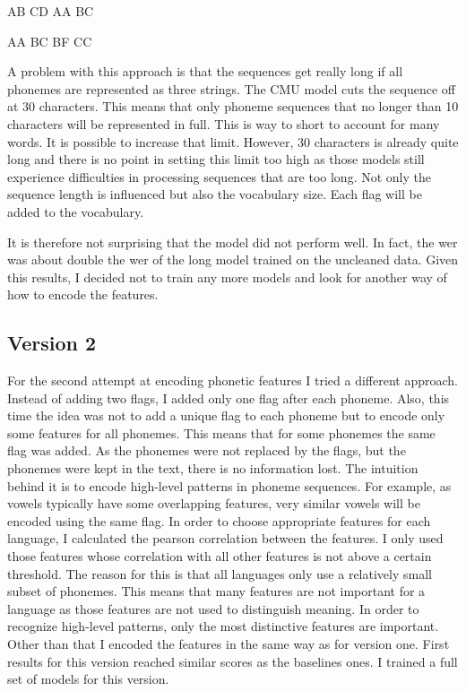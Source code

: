 \begin{covexamples}
\item \label{ex1}  AB CD  AA BC
\item \label{ex2}  AA BC   BF CC
\end{covexamples}

A problem with this approach is that the sequences get really long if all phonemes are represented as three strings. The CMU model cuts the sequence off at 30 characters. This means that only phoneme sequences that no longer than 10 characters will be represented in full. This is way to short to account for many words. It is possible to increase that limit. However, 30 characters is already quite long and there is no point in setting this limit too high as those models still experience difficulties in processing sequences that are too long. Not only the sequence length is influenced but also the vocabulary size. Each flag will be added to the vocabulary.  

It is therefore not surprising that the model did not perform well. In fact, the \ac{wer} was about double the \ac{wer} of the long model trained on the uncleaned data. Given this results, I decided not to train any more models and look for another way of how to encode the features.

\subsection*{Version 2}
For the second attempt at encoding phonetic features I tried a different approach. Instead of adding two flags, I added only one flag after each phoneme. Also, this time the idea was not to add a unique flag to each phoneme but to encode only some features for all phonemes. This means that for some phonemes the same flag was added. As the phonemes were not replaced by the flags, but the phonemes were kept in the text, there is no information lost. The intuition behind it is to encode high-level patterns in phoneme sequences. For example, as vowels typically have some overlapping features, very similar vowels will be encoded using the same flag. In order to choose appropriate features for each language, I calculated the pearson correlation between the features. I only used those features whose correlation with all other features is not above a certain threshold. The reason for this is that all languages only use a relatively small subset of phonemes. This means that many features are not important for a language as those features are not used to distinguish meaning. In order to recognize high-level patterns, only the most distinctive features are important. Other than that I encoded the features in the same way as for version one. First results for this version reached similar scores as the baselines ones. I trained a full set of models for this version.

